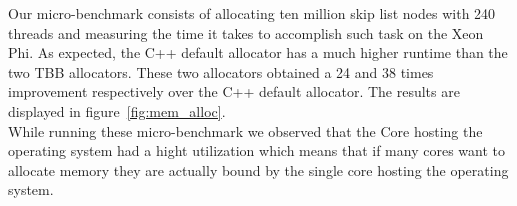 Our micro-benchmark consists of allocating ten million skip list nodes with 240 threads and measuring the time it takes to accomplish such task on the Xeon Phi.
As expected, the C++ default allocator has a much higher runtime than the two TBB allocators. These two allocators obtained a 24 and 38 times improvement respectively over the C++ default allocator. The results are displayed in figure~\ref{fig:mem_alloc}.\\
While running these micro-benchmark we observed that the Core hosting the operating system had a hight utilization which means that if many cores want to allocate memory they are actually bound by the single core hosting the operating system.
